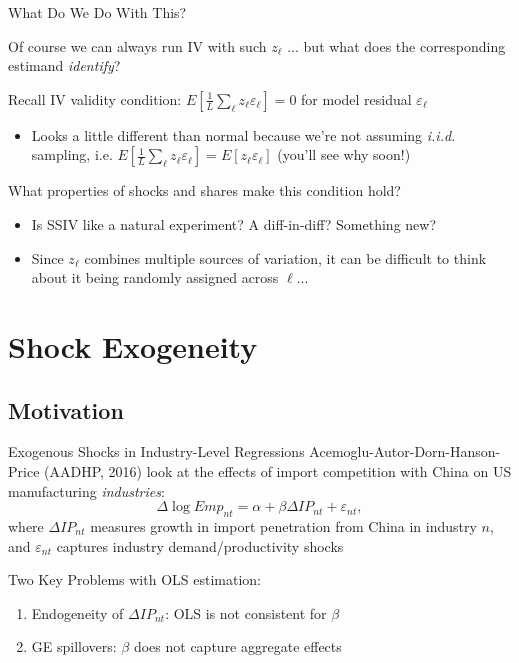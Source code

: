 \documentclass{beamer}
\begin{document}
\begin{frame}{What Do We Do With This?}

Of course we can always run IV with such $z_\ell$ ... but what does the corresponding estimand \emph{identify}?
\bigskip\pause{}

Recall IV validity condition: $E\left[\frac{1}{L}\sum_\ell z_\ell \varepsilon_\ell\right]=0$ for model residual $\varepsilon_\ell$\smallskip
\begin{itemize}
\item Looks a little different than normal because we're not assuming \emph{i.i.d.} sampling, i.e. $E\left[\frac{1}{L}\sum_\ell z_\ell \varepsilon_\ell\right]=E[z_\ell\varepsilon_\ell]$  (you'll see why soon!)
\end{itemize}
\bigskip\pause{}

What properties of shocks and shares make this condition hold?
\smallskip
\begin{itemize}
\item Is SSIV like a natural experiment? A diff-in-diff? Something new?
\item Since $z_\ell$ combines multiple sources of variation, it can be difficult to think about it being randomly assigned across $\ell$...
\end{itemize}
\end{frame}

\section{Shock Exogeneity}

\subsection{Motivation}

\begin{frame}{Exogenous Shocks in Industry-Level Regressions}
Acemoglu-Autor-Dorn-Hanson-Price (AADHP, 2016) look at the effects of import competition with China on US manufacturing  \emph{industries}:
$$\Delta\log Emp_{nt}=\alpha+\beta \Delta IP_{nt}+\varepsilon_{nt}, $$
where $\Delta IP_{nt}$ measures growth in import penetration from China in industry $n$, and $\varepsilon_{nt}$ captures industry demand/productivity shocks
\pause\bigskip

Two Key Problems with OLS estimation:\smallskip
\begin{enumerate}
\item Endogeneity of $\Delta IP_{nt}$: OLS is not consistent for $\beta$
\smallskip
\item GE spillovers: $\beta$ does not capture aggregate effects
\end{enumerate}
\end{frame}
\end{document}
